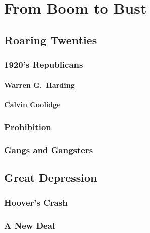 \chapter{From Boom to Bust}

\section{Roaring Twenties}

\subsection*{1920's Republicans}

\subsubsection*{Warren G.\ Harding}

\subsubsection*{Calvin Coolidge}

\subsection*{Prohibition}

\subsection*{Gangs and Gangsters}

\section{Great Depression}

\subsection*{Hoover's Crash}

\subsection*{A New Deal}

